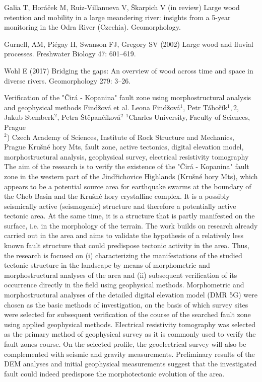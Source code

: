 {Galia T, Horáček M, Ruiz-Villanueva V, Škarpich V (in review) Large wood retention and mobility in a large meandering river: insights from a 5-year monitoring in the Odra River (Czechia). Geomorphology.

Gurnell, AM, Piégay H, Swanson FJ, Gregory SV (2002) Large wood and fluvial processes. Freshwater Biology 47: 601–619.

Wohl E (2017) Bridging the gaps: An overview of wood across time and space in diverse rivers. Geomorphology 279: 3–26.
}%

\abstract
{Verification of the "Čirá - Kopanina" fault zone using morphostructural analysis and geophysical methods} %
{Findžová et al.} %
{Leona Findžová$^1$, Petr Tábořík$^1,2$, Jakub Stemberk$^2$, Petra Štěpančíková$^2$} %
{\KLtag} %
{$^1$Charles University, Faculty of Sciences, Prague\\
$^2$) Czech Academy of Sciences, Institute of Rock Structure and Mechanics, Prague
} %
{}  %
{Krušné hory Mts, fault zone, active tectonics, digital elevation model, morphostructural analysis, geophysical survey, electrical resistivity tomography}%
{The aim of the research is to verify the existence of the "Čirá - Kopanina" fault zone in the western part of the Jindřichovice Highlands (Krušné hory Mts), which appears to be a potential source area for earthquake swarms at the boundary of the Cheb Basin and the Krušné hory crystalline complex. It is a possibly seismically active (seismogenic) structure and therefore a potentially active tectonic area. At the same time, it is a structure that is partly manifested on the surface, i.e. in the morphology of the terrain. The work builds on research already carried out in the area and aims to validate the hypothesis of a relatively less known fault structure that could predispose tectonic activity in the area. Thus, the research is focused on (i) characterizing the manifestations of the studied tectonic structure in the landscape by means of morphometric and morphostructural analyses of the area and (ii) subsequent verification of its occurrence directly in the field using geophysical methods. Morphometric and morphostructural analyses of the detailed digital elevation model (DMR 5G) were chosen as the basic methods of investigation, on the basis of which survey sites were selected for subsequent verification of the course of the searched fault zone using applied geophysical methods. Electrical resistivity tomography was selected as the primary method of geophysical survey as it is commonly used to verify the fault zones course. On the selected profile, the geoelectrical survey will also be complemented with seismic and gravity measurements. Preliminary results of the DEM analyses and initial geophysical measurements suggest that the investigated fault could indeed predispose the morphotectonic evolution of the area.
}%
{}%

